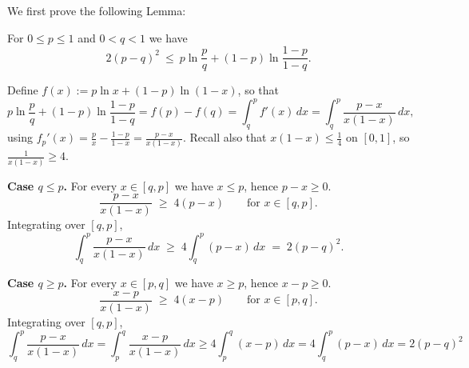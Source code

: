 \documentclass[fontsize=11pt, parskip=half]{scrartcl}
\begin{document}
We first prove the following Lemma:

\begin{lemma}\label{lem:pinsker_binary}
    For $0 \leq p \leq 1$ and $0 < q < 1$ we have
    \[
        2(p-q)^2 ~\leq~ p \ln \frac{p}{q} + (1-p) \ln \frac{1-p}{1-q}.
    \]
    \end{lemma}
    
    
    
    
    Define $f(x) := p \ln x + (1-p) \ln (1-x)$, so that
    \[
    p \ln \frac{p}{q} + (1-p) \ln \frac{1-p}{1-q} = f(p) - f(q)
    = \int_q^p f'(x)\, dx
    = \int_q^p \frac{p-x}{x(1-x)}\, dx,
    \]
    using $f_p'(x) = \frac{p}{x} - \frac{1-p}{1-x} = \frac{p-x}{x(1-x)}$. Recall also that $x(1-x) \leq \tfrac14$ on $[0,1]$, so $\frac{1}{x(1-x)} \geq 4$.
    
    \textbf{Case $q \leq p$.} For every $x \in [q,p]$ we have $x \leq p$, hence $p - x \geq 0$.
    \[
    \frac{p-x}{x(1-x)} \;\geq\; 4(p-x) \qquad \text{for } x \in [q,p].
    \]
    Integrating over $[q,p]$,
    \[
    \int_q^p \frac{p-x}{x(1-x)}\, dx \;\geq\; 4 \int_q^p (p-x)\, dx \;=\; 2(p-q)^2.
    \]
    
    \textbf{Case $q \geq p$.} For every $x \in [p,q]$ we have $x \geq p$, hence $x - p \geq 0$. 
    \[
    \frac{x-p}{x(1-x)} \;\geq\; 4(x-p) \qquad \text{for } x \in [p,q].
    \]
    Integrating over $[q,p]$,
    \[
    \int_q^p \frac{p-x}{x(1-x)}\, dx
    = \int_p^q \frac{x-p}{x(1-x)}\, dx
    \geq 4 \int_p^q (x-p)\, dx
    = 4 \int_q^p (p-x)\, dx
    = 2(p-q)^2
    \]
\end{document}
